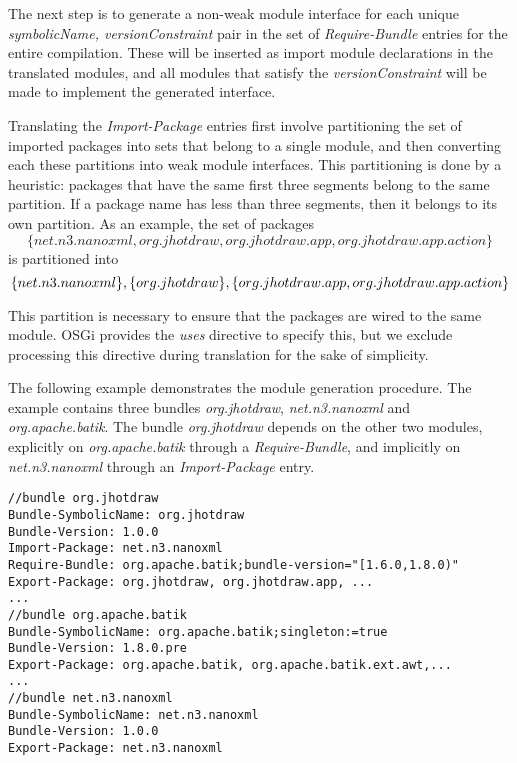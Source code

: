 The next step is to generate a non-weak module interface for each unique \textit{symbolicName, versionConstraint}
pair in the set of \textit{Require-Bundle} entries for the entire compilation. These will be inserted 
as import module declarations in the translated modules, and all modules that satisfy the \textit{versionConstraint}
will be made to implement the generated interface.

Translating the \textit{Import-Package} entries first involve partitioning the set of imported 
packages into sets that belong to a single module, and then converting each these partitions into
weak module interfaces. This partitioning is done by a heuristic: packages that have the same first
three segments belong to the same partition. If a package name has less than three segments, then
it belongs to its own partition. As an example, the set of packages\\
\[
\{net.n3.nanoxml, org.jhotdraw, org.jhotdraw.app, org.jhotdraw.app.action\}
\]
is partitioned into\\
\[\{net.n3.nanoxml\}, \{org.jhotdraw\}, \\ \{org.jhotdraw.app, org.jhotdraw.app.action\}\]

This partition is necessary to ensure that the packages are wired to the same module. OSGi provides
the \textit{uses} directive to specify this, but we exclude processing this directive during translation 
for the sake of simplicity.

The following example demonstrates the module generation procedure. The example contains three bundles
\textit{org.jhotdraw}, \textit{net.n3.nanoxml} and \textit{org.apache.batik}. The bundle \textit{org.jhotdraw}
depends on the other two modules, explicitly on \textit{org.apache.batik} through a \textit{Require-Bundle}, 
and implicitly on \textit{net.n3.nanoxml} through an \textit{Import-Package} entry.

\begin{lstlisting}[caption=Bundle Translation Example]
//bundle org.jhotdraw
Bundle-SymbolicName: org.jhotdraw
Bundle-Version: 1.0.0
Import-Package: net.n3.nanoxml
Require-Bundle: org.apache.batik;bundle-version="[1.6.0,1.8.0)"
Export-Package: org.jhotdraw, org.jhotdraw.app, ...
...
//bundle org.apache.batik
Bundle-SymbolicName: org.apache.batik;singleton:=true
Bundle-Version: 1.8.0.pre
Export-Package: org.apache.batik, org.apache.batik.ext.awt,...
...
//bundle net.n3.nanoxml
Bundle-SymbolicName: net.n3.nanoxml
Bundle-Version: 1.0.0
Export-Package: net.n3.nanoxml
\end{lstlisting}


